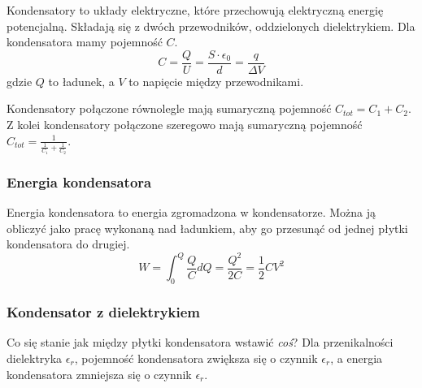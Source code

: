 \documentclass{../notatki}
\begin{document}
Kondensatory to układy elektryczne, które przechowują elektryczną energię
potencjalną. Składają się z dwóch przewodników, oddzielonych dielektrykiem.
Dla kondensatora mamy pojemność $C$.
$$
C = \frac{Q}{U} = \frac{S \cdot \epsilon_0}{d} = \frac{q}{\Delta V}
$$
gdzie $Q$ to ładunek, a $V$ to napięcie między przewodnikami.
\begin{figure*}[h]
  \centering
\end{figure*}
Kondensatory połączone równolegle mają sumaryczną pojemność $C_{tot}
= C_1 + C_2$. Z kolei kondensatory połączone szeregowo mają sumaryczną pojemność
$C_{tot} = \frac{1}{\frac{1}{C_1} + \frac{1}{C_2}}$.

\subsubsection{Energia kondensatora}

Energia kondensatora to energia zgromadzona w kondensatorze. Można ją
obliczyć jako pracę wykonaną nad ładunkiem, aby go przesunąć od jednej płytki
kondensatora do drugiej.
$$
W = \int_{0}^{Q} \frac{Q}{C} dQ = \frac{Q^2}{2C} = \frac{1}{2} C V^2
$$

\subsubsection{Kondensator z dielektrykiem}

Co się stanie jak między płytki kondensatora wstawić \textit{coś}?
Dla przenikalności dielektryka $\epsilon_r$, pojemność kondensatora zwiększa się
o czynnik $\epsilon_r$, a energia kondensatora zmniejsza się o
czynnik $\epsilon_r$.
\end{document}
